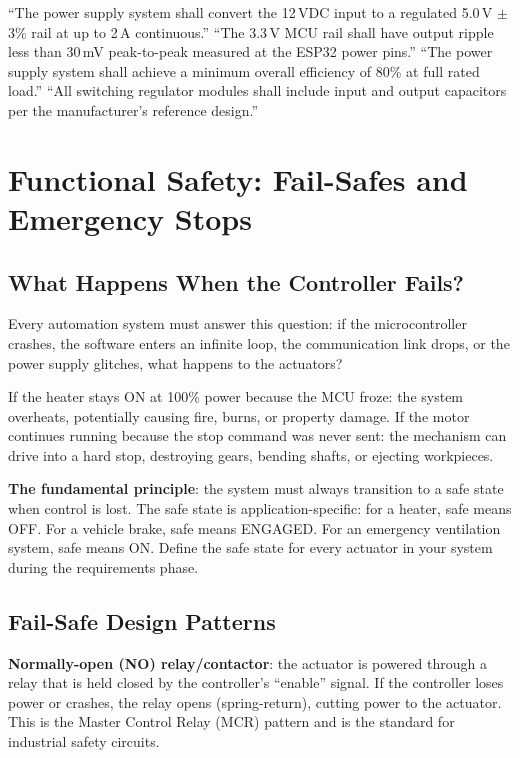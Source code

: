 \documentclass[11pt,letterpaper,twoside,openany]{book}
\begin{document}
\begin{keyconceptbox}
``The power supply system shall convert the 12\,VDC input to a regulated 5.0\,V $\pm$ 3\% rail at up to 2\,A continuous.'' ``The 3.3\,V MCU rail shall have output ripple less than 30\,mV peak-to-peak measured at the ESP32 power pins.'' ``The power supply system shall achieve a minimum overall efficiency of 80\% at full rated load.'' ``All switching regulator modules shall include input and output capacitors per the manufacturer's reference design.''
\end{keyconceptbox}

\section{Functional Safety: Fail-Safes and Emergency Stops}
\subsection{What Happens When the Controller Fails?}
Every automation system must answer this question: if the microcontroller crashes, the software enters an infinite loop, the communication link drops, or the power supply glitches, what happens to the actuators?

If the heater stays ON at 100\% power because the MCU froze: the system overheats, potentially causing fire, burns, or property damage. If the motor continues running because the stop command was never sent: the mechanism can drive into a hard stop, destroying gears, bending shafts, or ejecting workpieces.

\textbf{The fundamental principle}: the system must always transition to a safe state when control is lost. The safe state is application-specific: for a heater, safe means OFF. For a vehicle brake, safe means ENGAGED. For an emergency ventilation system, safe means ON. Define the safe state for every actuator in your system during the requirements phase.

\subsection{Fail-Safe Design Patterns}
\textbf{Normally-open (NO) relay/contactor}: the actuator is powered through a relay that is held closed by the controller's ``enable'' signal. If the controller loses power or crashes, the relay opens (spring-return), cutting power to the actuator. This is the Master Control Relay (MCR) pattern and is the standard for industrial safety circuits.
\end{document}
